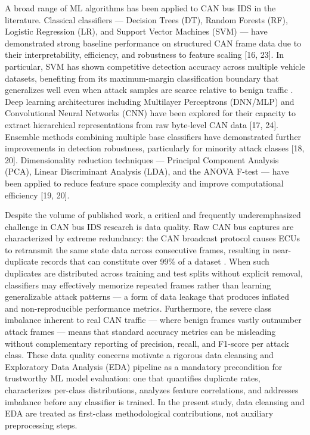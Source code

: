 \documentclass[conference]{IEEEtran}
\begin{document}
A broad range of ML algorithms has been applied to CAN bus IDS in the literature. Classical classifiers — Decision Trees (DT), Random Forests (RF), Logistic Regression (LR), and Support Vector Machines (SVM) — have demonstrated strong baseline performance on structured CAN frame data due to their interpretability, efficiency, and robustness to feature scaling \cite{8642311} [16, 23]. In particular, SVM has shown competitive detection accuracy across multiple vehicle datasets, benefiting from its maximum-margin classification boundary that generalizes well even when attack samples are scarce relative to benign traffic \cite{s23073610}. Deep learning architectures including Multilayer Perceptrons (DNN/MLP) and Convolutional Neural Networks (CNN) have been explored for their capacity to extract hierarchical representations from raw byte-level CAN data \cite{DESTA2022100470} [17, 24]. Ensemble methods combining multiple base classifiers have demonstrated further improvements in detection robustness, particularly for minority attack classes \cite{electronics14010069} [18, 20]. Dimensionality reduction techniques — Principal Component Analysis (PCA), Linear Discriminant Analysis (LDA), and the ANOVA F-test — have been applied to reduce feature space complexity and improve computational efficiency \cite{NABI2024100033} [19, 20].

Despite the volume of published work, a critical and frequently underemphasized challenge in CAN bus IDS research is data quality. Raw CAN bus captures are characterized by extreme redundancy: the CAN broadcast protocol causes ECUs to retransmit the same state data across consecutive frames, resulting in near-duplicate records that can constitute over 99\% of a dataset \cite{fi18010042}. When such duplicates are distributed across training and test splits without explicit removal, classifiers may effectively memorize repeated frames rather than learning generalizable attack patterns — a form of data leakage that produces inflated and non-reproducible performance metrics. Furthermore, the severe class imbalance inherent to real CAN traffic — where benign frames vastly outnumber attack frames — means that standard accuracy metrics can be misleading without complementary reporting of precision, recall, and F1-score per attack class. These data quality concerns motivate a rigorous data cleansing and Exploratory Data Analysis (EDA) pipeline as a mandatory precondition for trustworthy ML model evaluation: one that quantifies duplicate rates, characterizes per-class distributions, analyzes feature correlations, and addresses imbalance before any classifier is trained. In the present study, data cleansing and EDA are treated as first-class methodological contributions, not auxiliary preprocessing steps.
\end{document}
